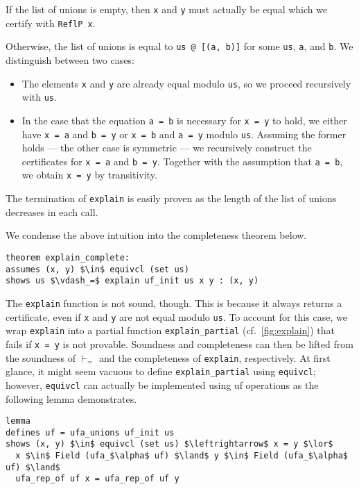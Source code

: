 \documentclass[
  sigplan,
  10pt,
  anonymous,
  review,
  ]{acmart}
\begin{document}
If the list of unions is empty, then \lstinline|x| and \lstinline|y| must actually be equal which we certify with \lstinline|ReflP x|.

Otherwise, the list of unions is equal to \lstinline|us @ [(a, b)]| for some \lstinline|us|, \lstinline|a|, and \lstinline|b|.
We distinguish between two cases:
\begin{itemize}
  \item The elements \lstinline|x| and \lstinline|y| are already equal modulo \lstinline|us|, so we proceed recursively with \lstinline|us|.
  \item In the case that the equation \lstinline|a = b| is necessary for \lstinline|x = y| to hold, we either have \lstinline|x = a| and \lstinline|b = y| or \lstinline|x = b| and \lstinline|a = y| modulo \lstinline|us|.
    Assuming the former holds --- the other case is symmetric --- we recursively construct the certificates for \lstinline|x = a| and \lstinline|b = y|.
    Together with the assumption that \lstinline|a = b|, we obtain \lstinline|x = y| by transitivity.
\end{itemize}
The termination of \lstinline|explain| is easily proven as the length of the list of unions decreases in each call.

We condense the above intuition into the completeness theorem below.
\begin{lstlisting}
theorem explain_complete:
assumes (x, y) $\in$ equivcl (set us)
shows us $\vdash_=$ explain uf_init us x y : (x, y)
\end{lstlisting}

The \lstinline|explain| function is not sound, though.
This is because it always returns a certificate, even if \lstinline|x| and \lstinline|y| are not equal modulo \lstinline|us|.
To account for this case, we wrap \lstinline|explain| into a partial function \lstinline|explain_partial| (cf.\ \autoref{fig:explain}) that fails if \lstinline|x = y| is not provable.
Soundness and completeness can then be lifted from the soundness of $\vdash_=$ and the completeness of \lstinline|explain|, respectively.
At first glance, it might seem vacuous to define \lstinline|explain_partial| using \lstinline|equivcl|;
however, \lstinline|equivcl| can actually be implemented using \acrshort{uf} operations as the following lemma demonstrates.
\begin{lstlisting}
lemma
defines uf = ufa_unions uf_init us
shows (x, y) $\in$ equivcl (set us) $\leftrightarrow$ x = y $\lor$
  x $\in$ Field (ufa_$\alpha$ uf) $\land$ y $\in$ Field (ufa_$\alpha$ uf) $\land$
  ufa_rep_of uf x = ufa_rep_of uf y
\end{lstlisting}
\end{document}
